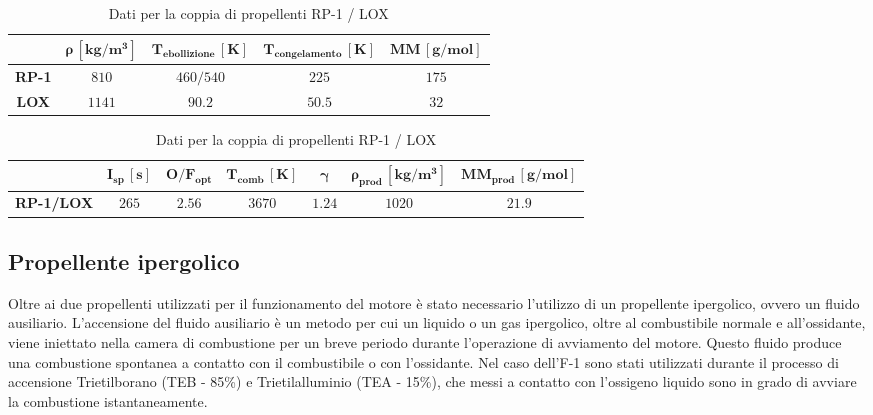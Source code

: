 \begin{table}[H]

\centering
\begin{tabular}{|c|c|c|c|c|}
\hline
& $\bm{\rho \, [kg/m^3]}$ & $\bm{T_{ebollizione} \, [K]}$ & $\bm{T_{congelamento} \, [K]}$ & $\bm{MM \, [g/mol]}$ \\
\hline
\textbf{RP-1} & $810$ & $460 / 540$ & $225$ & $175$ \\
\hline
\textbf{LOX} & $1141$ & $90.2$ & $50.5$ & $32$ \\
\hline
\end{tabular}

\vspace{5pt}

\begin{tabular}{|c|c|c|c|c|c|c|}
\hline
& $\bm{I_{sp} \, [s]}$ & $\bm{O/F_{opt}}$ & $\bm{T_{comb} \, [K]}$ & $\bm{\gamma}$ & $\bm{\rho_{prod} \, [kg/m^3]}$ & $\bm{MM_{prod} \, [g/mol]}$ \\
\hline
\textbf{RP-1/LOX} & $265$ & $2.56$ & $3670$ & $1.24$ & $1020$ & $21.9$ \\
\hline
\end{tabular}

\caption{Dati per la coppia di propellenti RP-1 / LOX}
\label{table:dati_propellenti}

\end{table}

\subsection{Propellente ipergolico}
\label{subsec:propellente_ipergolico}

Oltre ai due propellenti utilizzati per il funzionamento del motore è stato necessario l’utilizzo di un propellente ipergolico, ovvero un fluido ausiliario.
L'accensione del fluido ausiliario è un metodo per cui un liquido o un gas ipergolico, oltre al combustibile normale e all'ossidante, viene iniettato nella camera di combustione per un breve periodo durante l'operazione di avviamento del motore. Questo fluido produce una combustione spontanea a contatto con il combustibile o con l'ossidante.
Nel caso dell’F-1 sono stati utilizzati durante il processo di accensione Trietilborano (TEB - 85\%) e Trietilalluminio (TEA - 15\%), che messi a contatto con l’ossigeno liquido sono in grado di avviare la combustione istantaneamente.